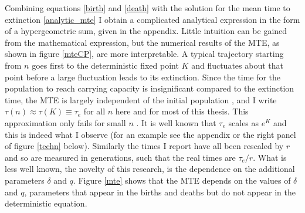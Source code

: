 Combining equations \ref{birth} and \ref{death} with the solution for the mean time to extinction \ref{analytic_mte} I obtain a complicated analytical expression in the form of a hypergeometric sum, given in the appendix. 
Little intuition can be gained from the mathematical expression, but the numerical results of the MTE, as shown in figure \ref{mteCP}, are more interpretable. 
A typical trajectory starting from $n$ goes first to the deterministic fixed point $K$ and fluctuates about that point before a large fluctuation leads to its extinction. 
Since the time for the population to reach carrying capacity is insignificant compared to the extinction time, the MTE is largely independent of the initial population \cite{Chotibut2015}, and I write $\tau(n) \approx \tau(K) \equiv \tau_e$ for all $n$ here and for most of this thesis. %
This approximation only fails for small $n$ \cite{Chotibut2015}. %
It is well known that $\tau_e$ scales as $e^K$ \cite{Lande1993,Ovaskainen2010} and this is indeed what I observe (for an example see the appendix or the right panel of figure \ref{techn} below). 
Similarly the times I report have all been rescaled by $r$ and so are measured in generations, such that the real times are $\tau_e/r$. 
What is less well known, the novelty of this research, is the dependence on the additional parameters $\delta$ and $q$. %
Figure \ref{mte} shows that the MTE depends on the values of $\delta$ and $q$, parameters that appear in the births and deaths but do not appear in the deterministic equation. %


